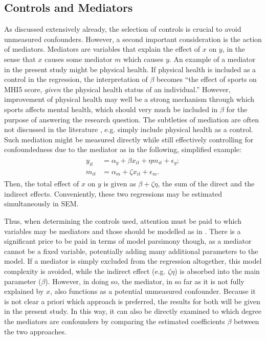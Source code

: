 \subsection{Controls and Mediators}
\label{sec:methods:controls_mediators}
As discussed extensively already, the selection of controls is crucial to avoid unmeasured confounders. However,
a second important consideration is the action of mediators. Mediators are variables that explain the effect
of $x$ on $y$, in the sense that $x$ causes some mediator $m$ which causes $y$. An example of a mediator in the present
study might be physical health. If physical health is included as a control in the regression, the interpretation of $\beta$
becomes ``the effect of sports on MHI5 score, \textit{given} the physical health status of an individual.'' However,
improvement of physical health may well be a strong mechanism through which sports affects mental health, which
should very much be included in $\beta$ for the purpose of answering the research question. The subtleties of mediation
are often not discussed in the literature \cite{imbens2024causal}, e.g.  simply include physical health as a control.
Such mediation might be measured directly while still effectively controlling for confoundedness due to the mediator as
in the following, simplified example:
\begin{align}
\begin{split}
    \label{eq:methods:mediation_example}
    y_{it} &= \alpha_y + \beta x_{it} + \eta m_{it} + \epsilon_y; \\
    m_{it} &= \alpha_m + \zeta x_{it} + \epsilon_m.
\end{split}
\end{align}
Then, the total effect of $x$ on $y$ is given as $\beta + \zeta \eta$, the sum of the direct and the indirect effects.
Conveniently, these two regressions may be estimated simultaneously in SEM.

Thus, when determining the controls used, attention must be paid to which variables may be mediators and those should be
modelled as in . There is a significant price to be paid in terms of model parsimony
though, as a mediator cannot be a fixed variable, potentially adding many additional parameters to the model.
If a mediator is simply excluded from the regression altogether, this model complexity is avoided, while the indirect
effect (e.g. $\zeta \eta$) is absorbed into the main parameter ($\beta$). However, in doing so, the mediator, in so far
as it is not fully explained by $x$, also functions as a potential unmeasured confounder.
Because it is not clear a priori which approach is preferred, the results for both will be given in the present study.
In this way, it can also be directly examined to which degree the mediators are confounders by comparing
the estimated coefficients $\beta$ between the two approaches.

